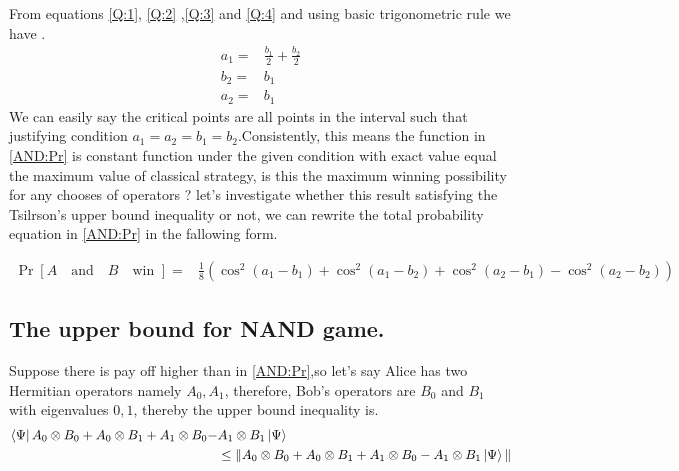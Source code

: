 From equations \ref{Q:1}, \ref{Q:2} ,\ref{Q:3} and \ref{Q:4} and using basic trigonometric rule  we have .
\begin{align}
a_1=&\frac{b_1}{2}+\frac{b_2}{2}\label{QQ:1}\\
b_2=&b_1\label{QQ:2}\\
a_2=&b_1\label{QQ:3}
\end{align} 
We can easily say the critical points are all points in the interval such  that justifying  condition $a_1=a_2= b_1=b_2$.Consistently,  this means the function in \ref{AND:Pr} is constant function under the given condition with exact value equal the maximum value of classical strategy, is this the maximum winning possibility for any chooses of operators ? let's investigate whether this result satisfying the Tsilrson's upper bound inequality or not, we can rewrite the total probability equation in \ref{AND:Pr} in the fallowing form.

\begin{align}\label{NAND:Pr}
\Pr[A\quad \text{and}\quad B \quad \text{win }  ]=&\frac{1}{8}\left( \cos^2(a_1-b_1)+\cos^2(a_1-b_2)
+\cos^2(a_2-b_1)-\cos^2(a_2-b_2)\right)
\end{align}
\subsection{The upper bound for NAND game.}
Suppose  there is pay off higher than  in \ref{AND:Pr},so let's say Alice has two Hermitian  operators  namely $A_0 ,A_1$, therefore, Bob's operators are $B_0$ and $B_1$  with eigenvalues $0,1$, thereby the upper bound inequality is.
\begin{align}\label{GGG}
\bra{\Psi} A_0\otimes B_0+A_0\otimes B_1+A_1\otimes B_0-& A_1\otimes B_1 \ket{\Psi}\nonumber\\
& \leq \| A_0\otimes B_0+A_0\otimes B_1+A_1\otimes B_0-A_1\otimes B_1 \ket{\Psi} \|
\end{align}


